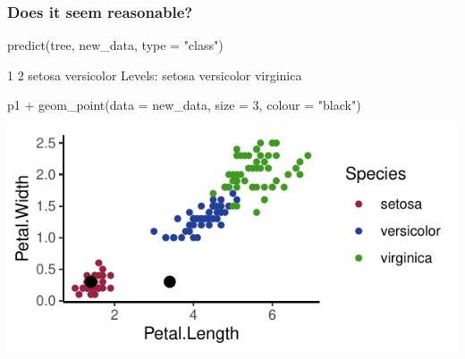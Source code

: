 \documentclass[a4paper]{article}
\begin{document}
\subsubsection{Does it seem reasonable?}
\begin{Schunk}
\begin{Sinput}
predict(tree, new_data, type = "class")
\end{Sinput}
\begin{Soutput}
         1          2 
    setosa versicolor 
Levels: setosa versicolor virginica
\end{Soutput}
\begin{Sinput}
p1 + geom_point(data = new_data, size = 3, colour = "black")
\end{Sinput}


{\centering \includegraphics[width=\maxwidth]{figure/listings-unnamed-chunk-435-1} 

}

\end{Schunk}
\end{document}

